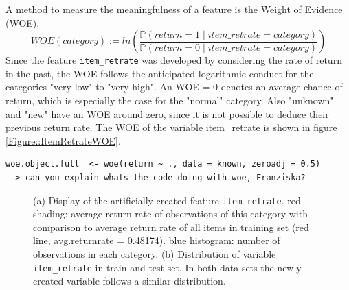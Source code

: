 \documentclass[a4paper,12pt]{article}
\begin{document}
A method to measure the meaningfulness of a feature is the Weight of Evidence (WOE).\\  
\begin{equation*}
WOE(category) := ln \left( \frac{\mathbb{P}(return=1 \mid item\_retrate=category)}{\mathbb{P}(return=0 \mid item\_retrate=category)} \right) 
\end{equation*}
\newline
Since the feature \texttt{item\_retrate} was developed by considering the rate of return in the past, the WOE follows the anticipated logarithmic conduct for the categories "very low" to "very high". An WOE = 0 denotes an average chance of return, which is especially the case for the "normal" category. Also "unknown" and "new" have an WOE around zero, since it is not possible to deduce their previous return rate. The WOE of the variable item\_retrate is shown in figure \ref{Figure::ItemRetrateWOE}.\\
\begin{lstlisting}
woe.object.full  <- woe(return ~ ., data = known, zeroadj = 0.5) 
--> can you explain whats the code doing with woe, Franziska?
\end{lstlisting}

\begin{figure}
	\caption{(a) Display of the artificially created feature \texttt{item\_retrate}. red shading: average return rate of observations of this category with comparison to average return rate of all items in training set (red line, avg.returnrate = 0.48174). blue histogram: number of observations in each category. (b) Distribution of variable \texttt{item\_retrate} in train and test set. In both data sets the newly created variable follows a similar distribution.}
	\label{Figure::ItemRetrate}
\end{figure}
\end{document}
